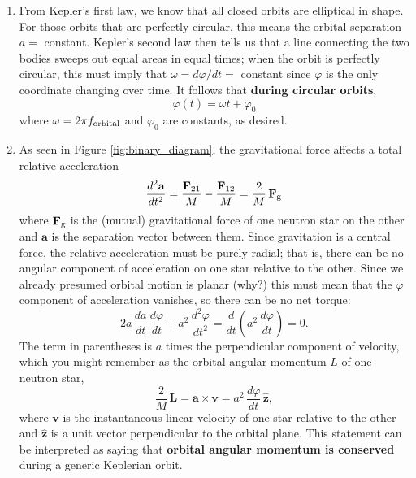 \documentclass[11pt]{article}
\begin{document}
\begin{enumerate}

\item From Kepler's first law, we know that all closed orbits are elliptical in shape. For those orbits that are perfectly circular, this means the orbital separation $a =$ constant. Kepler's second law then tells us that a line connecting the two bodies sweeps out equal areas in equal times; when the orbit is perfectly circular, this must imply that $\omega = d\varphi/dt =$ constant since $\varphi$ is the only coordinate changing over time. It follows that \textbf{during circular orbits},
\begin{equation}
\varphi(t) = \omega t + \varphi_0
\end{equation}
where $\omega = 2\pi f_{\rm orbital}$ and $\varphi_0$ are constants, as desired.

\item As seen in Figure \ref{fig:binary_diagram}, the gravitational force affects a total relative acceleration \[ \frac{d^2\mathbf{a}}{dt^2} = \frac{\mathbf{F}_{\rm 21}}{M} - \frac{\mathbf{F}_{\rm 12}}{M} = \frac{2}{M}\,\mathbf{F}_{\rm g} \] where $\mathbf{F}_{\rm g}$ is the (mutual) gravitational force of one neutron star on the other and $\mathbf{a}$ is the separation vector between them. Since gravitation is a central force, the relative acceleration must be purely radial; that is, there can be no angular component of acceleration on one star relative to the other. Since we already presumed orbital motion is planar (why?) this must mean that the $\varphi$ component of acceleration vanishes, so there can be no net torque: \[ 2a\,\frac{da}{dt}\,\frac{d\varphi}{dt} + a^2\,\frac{d^2\varphi}{dt^2} = \frac{d}{dt} \left( a^2\,\frac{d\varphi}{dt} \right) = 0. \]
The term in parentheses is $a$ times the perpendicular component of velocity, which you might remember as the orbital angular momentum $L$ of one neutron star,
\begin{equation}
\frac{2}{M}\, \mathbf{L} = \mathbf{a} \times \mathbf{v} = a^2\,\frac{d\varphi}{dt} \, \hat{\mathbf{z}},
\end{equation}
where $\mathbf{v}$ is the instantaneous linear velocity of one star relative to the other and $\hat{\mathbf{z}}$ is a unit vector perpendicular to the orbital plane. This statement can be interpreted as saying that \textbf{orbital angular momentum is conserved} during a generic Keplerian orbit.


\end{enumerate}
\end{document}
